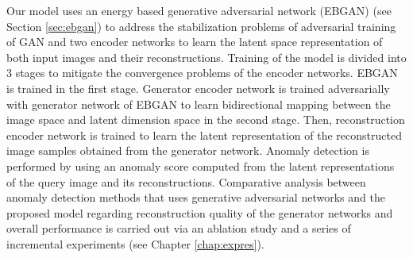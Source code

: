 Our model uses an energy based generative adversarial network (EBGAN)  (see Section \ref{sec:ebgan}) 
to address the stabilization problems of adversarial training of GAN and two encoder networks to 
learn the latent space  representation of both input images and their reconstructions. Training of the model 
is divided into 3 stages to mitigate the convergence problems of the encoder networks. EBGAN is trained 
in the first stage. Generator encoder network is trained adversarially with generator network of 
EBGAN to learn bidirectional mapping between the image space and latent dimension space in the 
second stage. Then, reconstruction encoder network is trained to learn the latent representation 
of the reconstructed image samples obtained from the generator network. Anomaly detection is performed 
by using an anomaly score computed from the latent representations of the query image and its 
reconstructions. Comparative analysis 
between anomaly detection methods that uses generative adversarial networks and the proposed 
model regarding reconstruction quality of the generator networks and overall performance is carried 
out via an ablation study and a series of incremental experiments (see Chapter \ref{chap:expres}).

